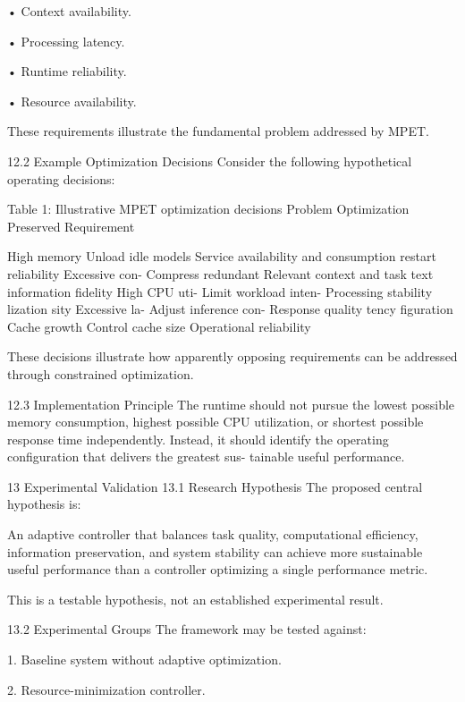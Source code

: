 \documentclass[10pt,a4paper]{article}
\begin{document}
\begin{ManuscriptText}
  • Context availability.

  • Processing latency.

  • Runtime reliability.

  • Resource availability.

   These requirements illustrate the fundamental problem addressed by MPET.


12.2      Example Optimization Decisions
Consider the following hypothetical operating decisions:

                    Table 1: Illustrative MPET optimization decisions
         Problem            Optimization             Preserved Requirement

         High     memory    Unload idle models    Service availability and
         consumption                              restart reliability
         Excessive con-     Compress redundant Relevant context and task
         text               information           fidelity
         High CPU uti-      Limit workload inten- Processing stability
         lization           sity
         Excessive    la-   Adjust inference con- Response quality
         tency              figuration
         Cache growth       Control cache size    Operational reliability


   These decisions illustrate how apparently opposing requirements can be addressed
through constrained optimization.


12.3      Implementation Principle
The runtime should not pursue the lowest possible memory consumption, highest possible
CPU utilization, or shortest possible response time independently.
    Instead, it should identify the operating configuration that delivers the greatest sus-
tainable useful performance.


13      Experimental Validation
13.1      Research Hypothesis
The proposed central hypothesis is:

       An adaptive controller that balances task quality, computational efficiency,
       information preservation, and system stability can achieve more sustainable
       useful performance than a controller optimizing a single performance metric.

   This is a testable hypothesis, not an established experimental result.


13.2     Experimental Groups
The framework may be tested against:

  1. Baseline system without adaptive optimization.

  2. Resource-minimization controller.


\end{ManuscriptText}
\end{document}
